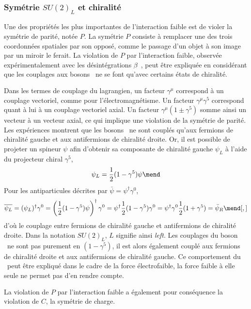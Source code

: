 \subsubsection{Symétrie $SU(2)_L$ et chiralité}\label{chapter-MS-MSSM-section-formalisme-subsec-EW-SU2_L}
Une des propriétés les plus importantes de l'interaction faible est de violer la symétrie de parité, notée $P$.
La symétrie $P$ consiste à remplacer une des trois coordonnées spatiales par son opposé, comme le passage d'un objet à son image par un miroir le ferait.
La violation de $P$ par l'interaction faible, observée expérimentalement avec les désintégrations $\beta$~\cite{Wu_P_violation}, peut être expliquée en considérant que les couplages aux bosons \Wboson\ ne se font qu'avec certains états de chiralité.
\par Dans les termes de couplage du lagrangien, un facteur $\gamma^\mu$ correspond à un couplage vectoriel, comme pour l'électromagnétisme. Un facteur $\gamma^\mu \gamma^5$ correspond quant à lui à un couplage vectoriel axial. Un facteur $\gamma^\mu (1\pm\gamma^5)$ somme ainsi un vecteur à un vecteur axial, ce qui implique une violation de la symétrie de parité.
Les expériences montrent que les bosons \Wboson\ ne sont couplés qu'aux fermions de chiralité gauche et aux antifermions de chiralité droite.
Or, il est possible de projeter un spineur $\psi$ afin d'obtenir sa composante de chiralité gauche $\psi_L$ à l'aide du projecteur chiral $\gamma^5$,
\begin{equation}
\psi_L = \frac{1}{2}(1-\gamma^5)\psi
\mend
\label{eq-projo_L}
\end{equation}
Pour les antiparticules décrites par $\bar{\psi}=\psi^\dagger \gamma^0$,
\begin{equation}
\overline{\psi_L}
= (\psi_L)^\dagger \gamma^0
= \left(\frac{1}{2}(1-\gamma^5)\psi\right)^\dagger\gamma^0
= \psi^\dagger \frac{1}{2} (1-\gamma^5) \gamma^0
= \psi^\dagger \gamma^0 \frac{1}{2} (1+\gamma^5)
= \bar{\psi}_R
\mend[,]
\label{eq-projo_R}
\end{equation}
d'où le couplage entre fermions de chiralité gauche et antifermions de chiralité droite.
Dans la notation $SU(2)_L$, $L$ signifie ainsi \emph{left}.
Les couplages du boson \Zboson\ ne sont pas purement en $(1-\gamma^5)$, il est alors également couplé aux fermions de chiralité droite et aux antifermions de chiralité gauche.
Ce comportement du \Zboson\ peut être expliqué dans le cadre de la force électrofaible, la force faible à elle seule ne permet pas d'en rendre compte.
\par La violation de $P$ par l'interaction faible a également pour conséquence la violation de $C$, la symétrie de charge.
